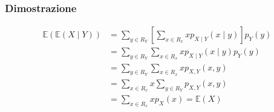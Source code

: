 \subsubsection*{Dimostrazione}
\begin{align*}
	\mathbb{E}(\mathbb{E}(X \mid Y)) & =\sum_{y \in R_Y}\left[\sum_{x \in R_x} x p_{X \mid Y}(x \mid y)\right] p_Y(y) \\
	                                 & =\sum_{y \in R_Y} \sum_{x \in R_x} x p_{X \mid Y}(x \mid y) p_Y(y)             \\ & =\sum_{y \in R_Y} \sum_{x \in R_x} x p_{X, Y}(x, y) \\ & =\sum_{x \in R_x} x \sum_{y \in R_Y} p_{X, Y}(x, y) \\ & =\sum_{x \in R_x} x p_X(x)=\mathbb{E}(X)
\end{align*}
\label{Composizione della varianza}
